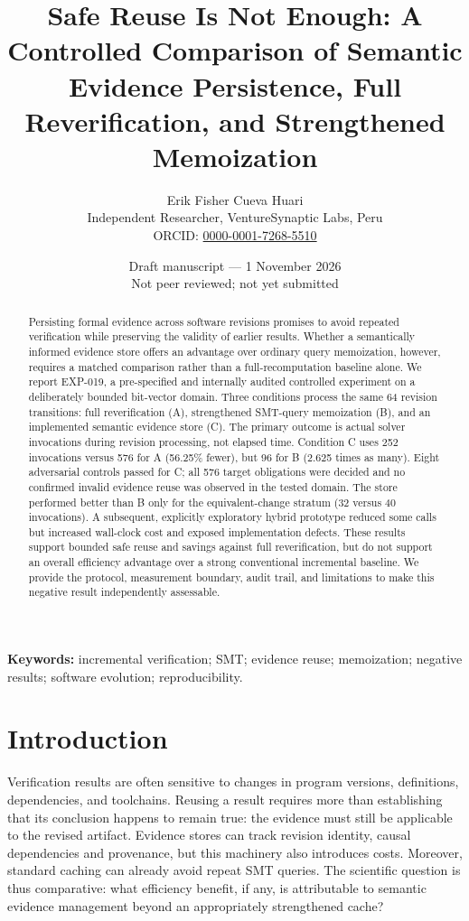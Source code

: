 \documentclass[10pt,twocolumn]{article}
\title{\bfseries Safe Reuse Is Not Enough: A Controlled Comparison of Semantic Evidence Persistence, Full Reverification, and Strengthened Memoization}
\author{Erik Fisher Cueva Huari\\\small Independent Researcher, VentureSynaptic Labs, Peru\\\small ORCID: \href{https://orcid.org/0000-0001-7268-5510}{0000-0001-7268-5510}}
\date{Draft manuscript --- 1 November 2026 \\ \small Not peer reviewed; not yet submitted}
\begin{document}
\maketitle
\begin{abstract}
Persisting formal evidence across software revisions promises to avoid repeated verification while preserving the validity of earlier results. Whether a semantically informed evidence store offers an advantage over ordinary query memoization, however, requires a matched comparison rather than a full-recomputation baseline alone. We report EXP-019, a pre-specified and internally audited controlled experiment on a deliberately bounded bit-vector domain. Three conditions process the same 64 revision transitions: full reverification (A), strengthened SMT-query memoization (B), and an implemented semantic evidence store (C). The primary outcome is actual solver invocations during revision processing, not elapsed time. Condition C uses 252 invocations versus 576 for A (56.25\% fewer), but 96 for B (2.625 times as many). Eight adversarial controls passed for C; all 576 target obligations were decided and no confirmed invalid evidence reuse was observed in the tested domain. The store performed better than B only for the equivalent-change stratum (32 versus 40 invocations). A subsequent, explicitly exploratory hybrid prototype reduced some calls but increased wall-clock cost and exposed implementation defects. These results support bounded safe reuse and savings against full reverification, but do not support an overall efficiency advantage over a strong conventional incremental baseline. We provide the protocol, measurement boundary, audit trail, and limitations to make this negative result independently assessable.
\end{abstract}
\noindent\textbf{Keywords:} incremental verification; SMT; evidence reuse; memoization; negative results; software evolution; reproducibility.

\section{Introduction}
Verification results are often sensitive to changes in program versions, definitions, dependencies, and toolchains. Reusing a result requires more than establishing that its conclusion happens to remain true: the evidence must still be applicable to the revised artifact. Evidence stores can track revision identity, causal dependencies and provenance, but this machinery also introduces costs. Moreover, standard caching can already avoid repeat SMT queries. The scientific question is thus comparative: what efficiency benefit, if any, is attributable to semantic evidence management beyond an appropriately strengthened cache?
\end{document}
